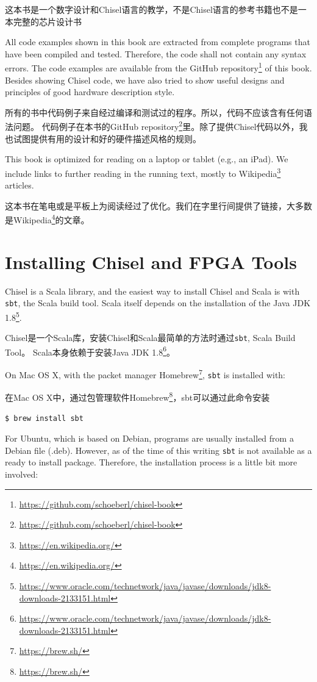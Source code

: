 \documentclass[%
    10pt,
    headinclude, footexclude,
    openright, %
    notitlepage,
    cleardoubleempty,
    headsepline,
    pointlessnumbers,
    bibtotoc, idxtotoc,
    ]{scrbook}
\newcommand{\code}[1]{{\small{\texttt{#1}}}}
\newcommand{\myref}[2]{\href{#1}{#2}}
\renewcommand{\myref}[2]{{#2}{\footnote{\url{#1}}}}
\begin{document}
这本书是一个数字设计和Chisel语言的教学，不是Chisel语言的参考书籍也不是一本完整的芯片设计书

All code examples shown in this book are extracted from complete programs
that have been compiled and tested. Therefore, the code shall not contain
any syntax errors. The code examples are available from the
\myref{https://github.com/schoeberl/chisel-book}{GitHub repository}
of this book.
Besides showing Chisel code, we have also tried to show useful designs and
principles of good hardware description style.

所有的书中代码例子来自经过编译和测试过的程序。所以，代码不应该含有任何语法问题。
代码例子在本书的\myref{https://github.com/schoeberl/chisel-book}{GitHub repository}里。除了提供Chisel代码以外，我也试图提供有用的设计和好的硬件描述风格的规则。


This book is optimized for reading on a laptop or tablet (e.g., an iPad).
We include links to further reading in the running text, mostly to
\myref{https://en.wikipedia.org/}{Wikipedia} articles.

这本书在笔电或是平板上为阅读经过了优化。我们在字里行间提供了链接，大多数是\myref{https://en.wikipedia.org/}{Wikipedia}的文章。

\section{Installing Chisel and FPGA Tools}

Chisel is a Scala library, and the easiest way to install Chisel and Scala is
with \code{sbt}, the Scala build tool. Scala itself depends on the installation
of the \myref{https://www.oracle.com/technetwork/java/javase/downloads/jdk8-downloads-2133151.html}{Java JDK 1.8}.

Chisel是一个Scala库，安装Chisel和Scala最简单的方法时通过\code{sbt}, Scala Build Tool。
Scala本身依赖于安装\myref{https://www.oracle.com/technetwork/java/javase/downloads/jdk8-downloads-2133151.html}{Java JDK 1.8}。

On Mac OS X, with the packet manager \myref{https://brew.sh/}{Homebrew},
\code{sbt} is installed with:

在Mac OS X中，通过包管理软件\myref{https://brew.sh/}{Homebrew}，sbt可以通过此命令安装

\begin{verbatim}
$ brew install sbt
\end{verbatim}

\noindent For Ubuntu, which is based on Debian, programs are usually installed from a
Debian file (.deb). However, as of the time of this writing \code{sbt} is not
available as a ready to install package. Therefore, the installation process
is a little bit more involved:
\end{document}
